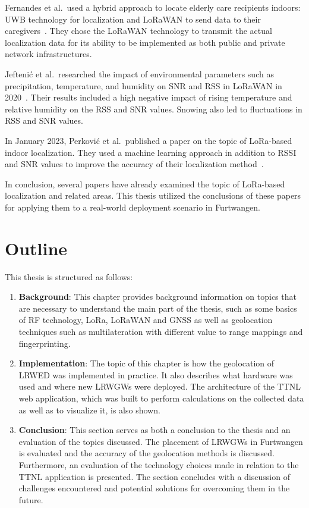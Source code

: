 Fernandes et al.\ used a hybrid approach to locate elderly care recipients indoors: \ac{UWB} technology for localization and \ac{LoRaWAN} to send data to their caregivers~\cite{fernandes_hybrid_2020}.
They chose the \ac{LoRaWAN} technology to transmit the actual localization data for its ability to be implemented as both public and private network infrastructures.

Jeftenić et al.\ researched the impact of environmental parameters such as precipitation, temperature, and humidity on \ac{SNR} and \ac{RSS} in \ac{LoRaWAN} in 2020~\cite{jeftenic_impact_2020}.
Their results included a high negative impact of rising temperature and relative humidity on the \ac{RSS} and \ac{SNR} values.
Snowing also led to fluctuations in \ac{RSS} and \ac{SNR} values.

In January 2023, Perković et al.\ published a paper on the topic of \ac{LoRa}-based indoor localization.
They used a machine learning approach in addition to \ac{RSSI} and \ac{SNR} values to improve the accuracy of their localization method~\cite{perkovic_machine_2023}.

In conclusion, several papers have already examined the topic of \ac{LoRa}-based localization and related areas.
This thesis utilized the conclusions of these papers for applying them to a real-world deployment scenario in Furtwangen.

\section{Outline}

This thesis is structured as follows:

\begin{enumerate}
      \item \textbf{Background}:
            This chapter provides background information on topics that are necessary to understand the main part of the thesis, such as some basics of \ac{RF} technology, \ac{LoRa}, \ac{LoRaWAN} and \ac{GNSS} as well as geolocation techniques such as multilateration with different value to range mappings and fingerprinting.
      \item \textbf{Implementation}:
            The topic of this chapter is how the geolocation of \acl{LRWED} was implemented in practice.
            It also describes what hardware was used and where new \aclp{LRWGW} were deployed.
            The architecture of the \ac{TTNL} web application, which was built to perform calculations on the collected data as well as to visualize it, is also shown.
      \item \textbf{Conclusion}:
            This section serves as both a conclusion to the thesis and an evaluation of the topics discussed.
            The placement of \aclp{LRWGW} in Furtwangen is evaluated and the accuracy of the geolocation methods is discussed.
            Furthermore, an evaluation of the technology choices made in relation to the \ac{TTNL} application is presented.
            The section concludes with a discussion of challenges encountered and potential solutions for overcoming them in the future.
\end{enumerate}

